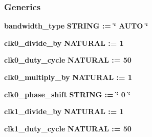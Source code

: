 \subsubsection*{Generics}
 \begin{DoxyCompactItemize}
\item 
{\bf bandwidth\+\_\+type} {\bfseries {\bfseries \textcolor{comment}{S\+T\+R\+I\+NG}\textcolor{vhdlchar}{ }\textcolor{vhdlchar}{ }\textcolor{vhdlchar}{\+:}\textcolor{vhdlchar}{=}\textcolor{vhdlchar}{ }\textcolor{vhdlchar}{ }\textcolor{vhdlchar}{ }\textcolor{vhdlchar}{ }\textcolor{keyword}{\char`\"{} A\+U\+T\+O \char`\"{}}\textcolor{vhdlchar}{ }}}
\item 
{\bf clk0\+\_\+divide\+\_\+by} {\bfseries {\bfseries \textcolor{comment}{N\+A\+T\+U\+R\+AL}\textcolor{vhdlchar}{ }\textcolor{vhdlchar}{ }\textcolor{vhdlchar}{\+:}\textcolor{vhdlchar}{=}\textcolor{vhdlchar}{ }\textcolor{vhdlchar}{ } \textcolor{vhdldigit}{1} \textcolor{vhdlchar}{ }}}
\item 
{\bf clk0\+\_\+duty\+\_\+cycle} {\bfseries {\bfseries \textcolor{comment}{N\+A\+T\+U\+R\+AL}\textcolor{vhdlchar}{ }\textcolor{vhdlchar}{ }\textcolor{vhdlchar}{\+:}\textcolor{vhdlchar}{=}\textcolor{vhdlchar}{ }\textcolor{vhdlchar}{ } \textcolor{vhdldigit}{50} \textcolor{vhdlchar}{ }}}
\item 
{\bf clk0\+\_\+multiply\+\_\+by} {\bfseries {\bfseries \textcolor{comment}{N\+A\+T\+U\+R\+AL}\textcolor{vhdlchar}{ }\textcolor{vhdlchar}{ }\textcolor{vhdlchar}{\+:}\textcolor{vhdlchar}{=}\textcolor{vhdlchar}{ }\textcolor{vhdlchar}{ } \textcolor{vhdldigit}{1} \textcolor{vhdlchar}{ }}}
\item 
{\bf clk0\+\_\+phase\+\_\+shift} {\bfseries {\bfseries \textcolor{comment}{S\+T\+R\+I\+NG}\textcolor{vhdlchar}{ }\textcolor{vhdlchar}{ }\textcolor{vhdlchar}{\+:}\textcolor{vhdlchar}{=}\textcolor{vhdlchar}{ }\textcolor{vhdlchar}{ }\textcolor{vhdlchar}{ }\textcolor{vhdlchar}{ }\textcolor{keyword}{\char`\"{} 0 \char`\"{}}\textcolor{vhdlchar}{ }}}
\item 
{\bf clk1\+\_\+divide\+\_\+by} {\bfseries {\bfseries \textcolor{comment}{N\+A\+T\+U\+R\+AL}\textcolor{vhdlchar}{ }\textcolor{vhdlchar}{ }\textcolor{vhdlchar}{\+:}\textcolor{vhdlchar}{=}\textcolor{vhdlchar}{ }\textcolor{vhdlchar}{ } \textcolor{vhdldigit}{1} \textcolor{vhdlchar}{ }}}
\item 
{\bf clk1\+\_\+duty\+\_\+cycle} {\bfseries {\bfseries \textcolor{comment}{N\+A\+T\+U\+R\+AL}\textcolor{vhdlchar}{ }\textcolor{vhdlchar}{ }\textcolor{vhdlchar}{\+:}\textcolor{vhdlchar}{=}\textcolor{vhdlchar}{ }\textcolor{vhdlchar}{ } \textcolor{vhdldigit}{50} \textcolor{vhdlchar}{ }}}

\end{DoxyCompactItemize}
